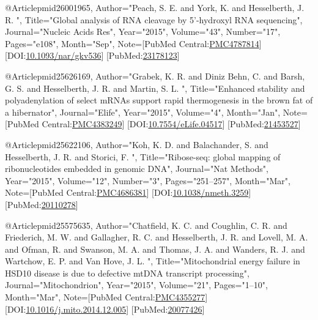 @Article{pmid26001965,
   Author="Peach, S. E.  and York, K.  and Hesselberth, J. R. ",
   Title="{{G}lobal analysis of {R}{N}{A} cleavage by 5'-hydroxyl {R}{N}{A} sequencing}",
   Journal="Nucleic Acids Res",
   Year="2015",
   Volume="43",
   Number="17",
   Pages="e108",
   Month="Sep",
   Note={[PubMed Central:\href{https://www.ncbi.nlm.nih.gov/pmc/articles/PMC4787814}{PMC4787814}] [DOI:\href{https://dx.doi.org/10.1093/nar/gkv536}{10.1093/nar/gkv536}] [PubMed:\href{https://www.ncbi.nlm.nih.gov/pubmed/23178123}{23178123}] }
}

@Article{pmid25626169,
   Author="Grabek, K. R.  and Diniz Behn, C.  and Barsh, G. S.  and Hesselberth, J. R.  and Martin, S. L. ",
   Title="{{E}nhanced stability and polyadenylation of select m{R}{N}{A}s support rapid thermogenesis in the brown fat of a hibernator}",
   Journal="Elife",
   Year="2015",
   Volume="4",
   Month="Jan",
   Note={[PubMed Central:\href{https://www.ncbi.nlm.nih.gov/pmc/articles/PMC4383249}{PMC4383249}] [DOI:\href{https://dx.doi.org/10.7554/eLife.04517}{10.7554/eLife.04517}] [PubMed:\href{https://www.ncbi.nlm.nih.gov/pubmed/21453527}{21453527}] }
}

@Article{pmid25622106,
   Author="Koh, K. D.  and Balachander, S.  and Hesselberth, J. R.  and Storici, F. ",
   Title="{{R}ibose-seq: global mapping of ribonucleotides embedded in genomic {D}{N}{A}}",
   Journal="Nat Methods",
   Year="2015",
   Volume="12",
   Number="3",
   Pages="251--257",
   Month="Mar",
   Note={[PubMed Central:\href{https://www.ncbi.nlm.nih.gov/pmc/articles/PMC4686381}{PMC4686381}] [DOI:\href{https://dx.doi.org/10.1038/nmeth.3259}{10.1038/nmeth.3259}] [PubMed:\href{https://www.ncbi.nlm.nih.gov/pubmed/20110278}{20110278}] }
}

@Article{pmid25575635,
   Author="Chatfield, K. C.  and Coughlin, C. R.  and Friederich, M. W.  and Gallagher, R. C.  and Hesselberth, J. R.  and Lovell, M. A.  and Ofman, R.  and Swanson, M. A.  and Thomas, J. A.  and Wanders, R. J.  and Wartchow, E. P.  and Van Hove, J. L. ",
   Title="{{M}itochondrial energy failure in {H}{S}{D}10 disease is due to defective mt{D}{N}{A} transcript processing}",
   Journal="Mitochondrion",
   Year="2015",
   Volume="21",
   Pages="1--10",
   Month="Mar",
   Note={[PubMed Central:\href{https://www.ncbi.nlm.nih.gov/pmc/articles/PMC4355277}{PMC4355277}] [DOI:\href{https://dx.doi.org/10.1016/j.mito.2014.12.005}{10.1016/j.mito.2014.12.005}] [PubMed:\href{https://www.ncbi.nlm.nih.gov/pubmed/20077426}{20077426}] }
}

